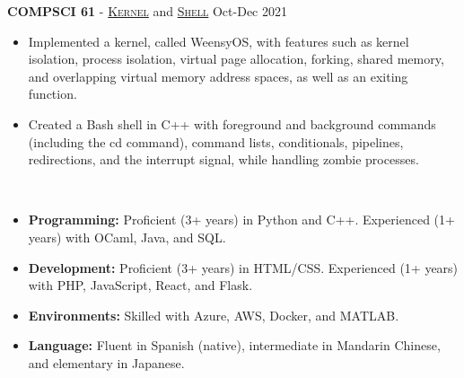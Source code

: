 \documentclass[11pt]{article}
\begin{document}
    \noindent \textbf{COMPSCI 61} - 
      \href{https://cs61.seas.harvard.edu/site/2021/WeensyOS/}{\textsc{Kernel}} and 
      \href{https://cs61.seas.harvard.edu/site/2021/Shell/}{\textsc{Shell}} \hfill Oct-Dec 2021
    \begin{itemize}[itemsep=-.4em, leftmargin=1em]\vspace{-2mm}
      \item Implemented a kernel, called WeensyOS, with features such as kernel isolation, process isolation, virtual page allocation, forking, shared memory, and overlapping virtual memory address spaces, as well as an exiting function.
      \item Created a Bash shell in C++ with foreground and background commands (including the cd command), command lists, conditionals, pipelines, redirections, and the interrupt signal, while handling zombie processes.
    \end{itemize}

   \vspace{-7pt}\\
   \noindent\makebox[\linewidth]{\rule{7.5in}{0.3pt}}
   \begin{itemize}[itemsep=-.4em, leftmargin=1em]\vspace{-2mm}
     \item \textbf{Programming:} Proficient (3+ years) in Python and C++. Experienced (1+ years) with OCaml, Java, and SQL.
     \item \textbf{Development:} Proficient (3+ years) in HTML/CSS. Experienced (1+ years) with PHP, JavaScript, React, and Flask.
     \item \textbf{Environments:} Skilled with Azure, AWS, Docker, and MATLAB.
     \item \textbf{Language:} 
       Fluent in Spanish (native), intermediate in Mandarin Chinese, and elementary in Japanese.
   \end{itemize}
\end{document}
